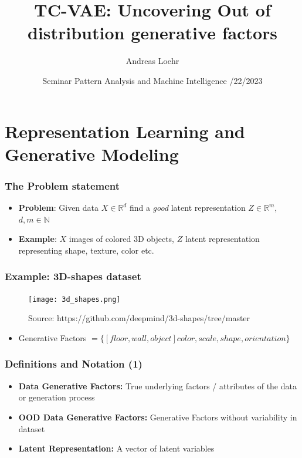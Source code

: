 \documentclass{beamer}
\title[]{TC-VAE: Uncovering Out of distribution generative factors}
\author{Andreas Loehr}
\institute{Goethe Universität Frankfurt a.M.}
\date{
  \vspace{0.2cm}
  Seminar Pattern Analysis and Machine Intelligence
  \vspace{0.4cm}
  \newline 06/22/2023\\
  \vspace{0.3cm} %
  }
\theoremstyle{definition}
\begin{document}
  \AtBeginSection[]
  {
      \begin{frame}
          \tableofcontents[currentsection]
      \end{frame}
    }
  \begin{frame}
    \begin{titlepage}
    \end{titlepage}
  \end{frame}

  \section{Representation Learning and Generative Modeling}
    \begin{frame}
      \frametitle{The Problem statement}
      \begin{itemize}
        \item \textbf{Problem}: Given data $X \in \mathbb{R}^{d}$ find a \textit{good} latent representation $Z \in \mathbb{R}^{m}$, $d, m \in \mathbb{N}$
        \item \textbf{Example}: $X$ images of colored 3D objects, $Z$ latent representation representing shape, texture, color etc.
      \end{itemize}
     \end{frame}

     \begin{frame}
      \frametitle{Example: 3D-shapes dataset}
      \begin{figure}
        \centering
        \texttt{[image: 3d\_shapes.png]}
        \captionsetup{justification=centering}
        \caption*{\tiny{Source: https://github.com/deepmind/3d-shapes/tree/master}}
      \end{figure}
      \begin{itemize}
        \item Generative Factors $=\{[floor, wall, object] color, scale, shape, orientation\}$
      \end{itemize}
     \end{frame}

      \begin{frame}
        \frametitle{Definitions and Notation (1)}
        \begin{itemize}
          \item \textbf{Data Generative Factors:} True underlying factors / attributes of the data or generation process
          \item \textbf{OOD Data Generative Factors:} Generative Factors without variability in dataset
          \item \textbf{Latent Representation:} A vector of latent variables
        \end{itemize}
      \end{frame}
\end{document}
